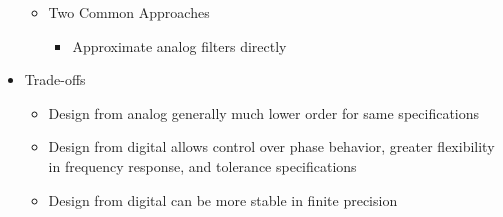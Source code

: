 \begin{itemize}
\begin{itemize}
      \item Two Common Approaches

        \begin{itemize}

          \item Approximate analog filters directly

        \end{itemize}

    \end{itemize}

  \item Trade-offs

    \begin{itemize}

      \item Design from analog generally much lower order for same specifications

      \item Design from digital allows control over phase behavior, greater flexibility in frequency response, and tolerance specifications

      \item Design from digital can be more stable in finite precision

    \end{itemize}

\end{itemize}



